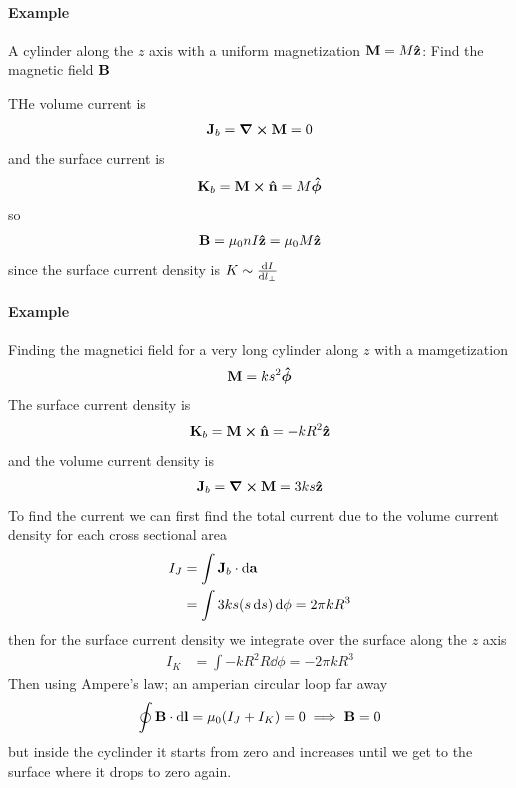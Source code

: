 \documentclass[../main.tex]{subfiles}
\begin{document}
\paragraph{Example} A cylinder along the $z$ axis with a uniform magnetization $\vb M = M \vu z$: Find the magnetic field $\vb B$

THe volume current is
\begin{align*}
    \vb J_b = \grad \cross \vb M = 0
\end{align*}
and the surface current is
\begin{align*}
    \vb K_b = \vb M \cross \vu n = M \vu*\phi
\end{align*}
so
\begin{align*}
    \vb B = \mu_0 n I \vu z = \mu_0 M \vu z
\end{align*}
since the surface current density is $K \sim \dv{I}{l_\perp}$

\paragraph{Example} Finding the magnetici field for a very long cylinder along $z$ with a mamgetization
\begin{align*}
    \vb M = k s^2 \vu*\phi
\end{align*}
The surface current density is
\begin{align*}
    \vb K_b = \vb M \cross \vu n = -k R^2 \vu z
\end{align*}
and the volume current density is 
\begin{align*}
    \vb J_b = \grad \cross \vb M = 3ks \vu z
\end{align*}
To find the current we can first find the total current due to the volume current density for each cross sectional area
\begin{align*}
    I_J &= \int \vb J_b \cdot \dd{\vb a} \\
    &= \int 3ks (s\dd{s}) \dd{\phi} = 2\pi k R^3
\end{align*}
then for the surface current density we integrate over the surface along the $z$ axis
\begin{align*}
    I_K &= \int -k R^2 R \dd{\phi} = -2\pi k R^3
\end{align*}
Then using Ampere's law; an amperian circular loop far away
\begin{align*}
    \oint \vb B \cdot \dd{\vb l} = \mu_0 (I_J + I_K) = 0 \implies \vb B = 0
\end{align*}
but inside the cyclinder it starts from zero and increases until we get to the surface where it drops to zero again.
\end{document}
